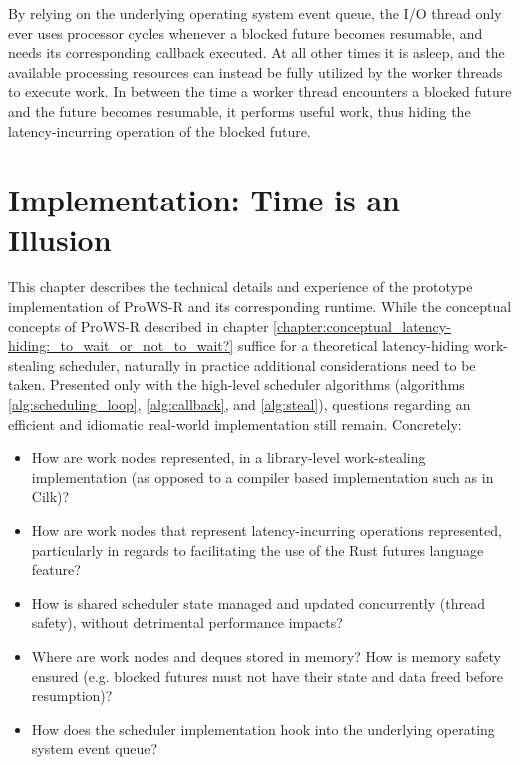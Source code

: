 \documentclass[bsc,frontabs,singlespacing,parskip,deptreport,normalheadings]{infthesis}
\begin{document}
By relying on the underlying operating system event queue, the I/O thread only
ever uses processor cycles whenever a blocked future becomes resumable, and
needs its corresponding callback executed. At all other times it is asleep, and
the available processing resources can instead be fully utilized by the worker
threads to execute work. In between the time a worker thread encounters a
blocked future and the future becomes resumable, it performs useful work, thus
hiding the latency-incurring operation of the blocked future.


\chapter{Implementation: Time is an Illusion}

This chapter describes the technical details and experience of the prototype
implementation of ProWS-R and its corresponding runtime. While the conceptual
concepts of ProWS-R described in chapter
\ref{chapter:conceptual_latency-hiding:_to_wait_or_not_to_wait?} suffice for a
theoretical latency-hiding work-stealing scheduler, naturally in practice
additional considerations need to be taken. Presented only with the high-level
scheduler algorithms (algorithms \ref{alg:scheduling_loop}, \ref{alg:callback},
and \ref{alg:steal}), questions regarding an efficient and idiomatic real-world
implementation still remain. Concretely:

\begin{itemize}
    \item How are work nodes represented, in a library-level work-stealing
        implementation (as opposed to a compiler based implementation such as in
        Cilk)?
    \item How are work nodes that represent latency-incurring operations
        represented, particularly in regards to facilitating the use of the Rust
        futures language feature?
    \item How is shared scheduler state managed and updated concurrently (thread
        safety), without detrimental performance impacts?
    \item Where are work nodes and deques stored in memory? How is memory safety
        ensured (e.g. blocked futures must not have their state and data freed
        before resumption)?
    \item How does the scheduler implementation hook into the underlying
        operating system event queue?
\end{itemize}
\end{document}
